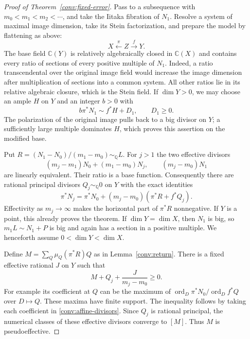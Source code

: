\begin{proof}[Proof of Theorem~\ref{conv:fixed-error}]
Pass to a subsequence with $m_0<m_1<m_2<\cdots$, and take the Iitaka
fibration of $N_1$.  Resolve a system of maximal image dimension, take
its Stein factorization, and prepare the model by flattening as above:
\[
 X\xleftarrow{\ \pi\ }Z\xrightarrow{\ f\ }Y.
\]
The base field $\mathbb C(Y)$ is relatively algebraically closed in
$\mathbb C(X)$ and contains every ratio of sections of every positive
multiple of $N_1$.  Indeed, a ratio transcendental over the original
image field would increase the image dimension after multiplication of
sections into a common system.  All other ratios lie in its relative
algebraic closure, which is the Stein field.  If $\dim Y>0$, we may
choose an ample $H$ on $Y$ and an integer $b>0$ with
\begin{equation}\label{conv:iitaka-polarization}
 b\pi^*N_1\sim f^*H+D_1,\qquad D_1\ge0.
\end{equation}
The polarization of the original image pulls back to a big divisor on
$Y$; a sufficiently large multiple dominates $H$, which proves this
assertion on the modified base.

Put $R=(N_1-N_0)/(m_1-m_0)\sim_{\mathbb Q}L$.  For $j>1$ the two
effective divisors
\[
 (m_j-m_1)N_0+(m_1-m_0)N_j,
 \qquad (m_j-m_0)N_1
\]
are linearly equivalent.  Their ratio is a base function.  Consequently
there are rational principal divisors $Q_j\sim_{\mathbb Q}0$ on $Y$
with the exact identities
\begin{equation}\label{conv:affine-divisors}
 \pi^*N_j=\pi^*N_0+(m_j-m_0)(\pi^*R+f^*Q_j).
\end{equation}
Effectivity as $m_j\to\infty$ makes the horizontal part of $\pi^*R$
nonnegative.  If $Y$ is a point, this already proves the theorem.  If
$\dim Y=\dim X$, then $N_1$ is big, so $m_1L\sim N_1+P$ is big and
again has a section in a positive multiple.  We henceforth assume
$0<\dim Y<\dim X$.

Define $M=\sum_Q\mu_Q(\pi^*R)Q$ as in
Lemma~\ref{conv:return}.  There is a fixed effective rational $J$ on
$Y$ such that
\[
 M+Q_j+\frac{J}{m_j-m_0}\ge0.
\]
For example its coefficient at $Q$ can be the maximum of
$\operatorname{ord}_D\pi^*N_0/\operatorname{ord}_D f^*Q$ over
$D\mapsto Q$.  These maxima have finite support.  The inequality
follows by taking each coefficient in \eqref{conv:affine-divisors}.
Since $Q_j$ is rational principal, the numerical classes of these
effective divisors converge to $[M]$.  Thus $M$ is pseudoeffective.


\end{proof}
